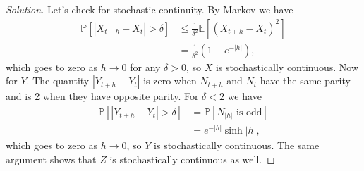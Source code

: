 \documentclass[11pt,letterpaper]{report}
\newcommand{\E}{\mathbb{E}}
\newcommand{\Prob}{\mathbb{P}}
\newenvironment{solution}
{\begin{proof}[Solution]}
{\end{proof}}
\begin{document}
\begin{solution}
	\noindent Let's check for stochastic continuity. By Markov we have
	\begin{align*}
		\Prob[|X_{t+h}-X_t|>\delta] &\leq \frac{1}{\delta^2}\E[(X_{t+h}-X_t)^2]\\
		&= \frac{1}{\delta^2}\left(1-e^{-|h|}\right),
	\end{align*}
	which goes to zero as $h\to 0$ for any $\delta>0$, so $X$ is stochastically continuous. Now for $Y$. The quantity $|Y_{t+h}-Y_t|$ is zero when $N_{t+h}$ and $N_t$ have the same parity and is 2 when they have opposite parity. For $\delta<2$ we have
	\begin{align*}
		\Prob[|Y_{t+h}-Y_t|>\delta] &= \Prob[N_{|h|}\text{ is odd}]\\
		&= e^{-|h|}\sinh |h|,
	\end{align*}
	which goes to zero as $h\to 0$, so $Y$ is stochastically continuous. The same argument shows that $Z$ is stochastically continuous as well.
\end{solution}
\end{document}
